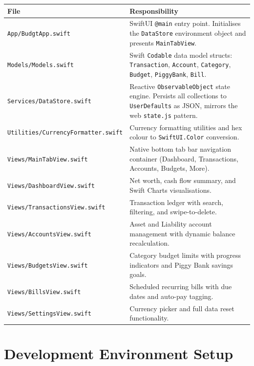 \documentclass[12pt, a4paper]{article}
\begin{document}
\begin{longtable}{L{4.5cm} L{10cm}}
  \toprule
  \textbf{File} & \textbf{Responsibility} \\
  \midrule
  \endhead
  \texttt{App/BudgtApp.swift} & SwiftUI \texttt{@main} entry point. Initialises the \texttt{DataStore} environment object and presents \texttt{MainTabView}. \\[4pt]
  \texttt{Models/Models.swift} & Swift \texttt{Codable} data model structs: \texttt{Transaction}, \texttt{Account}, \texttt{Category}, \texttt{Budget}, \texttt{PiggyBank}, \texttt{Bill}. \\[4pt]
  \texttt{Services/DataStore.swift} & Reactive \texttt{ObservableObject} state engine. Persists all collections to \texttt{UserDefaults} as JSON, mirrors the web \texttt{state.js} pattern. \\[4pt]
  \texttt{Utilities/CurrencyFormatter.swift} & Currency formatting utilities and hex colour to \texttt{SwiftUI.Color} conversion. \\[4pt]
  \texttt{Views/MainTabView.swift} & Native bottom tab bar navigation container (Dashboard, Transactions, Accounts, Budgets, More). \\[4pt]
  \texttt{Views/DashboardView.swift} & Net worth, cash flow summary, and Swift Charts visualisations. \\[4pt]
  \texttt{Views/TransactionsView.swift} & Transaction ledger with search, filtering, and swipe-to-delete. \\[4pt]
  \texttt{Views/AccountsView.swift} & Asset and Liability account management with dynamic balance recalculation. \\[4pt]
  \texttt{Views/BudgetsView.swift} & Category budget limits with progress indicators and Piggy Bank savings goals. \\[4pt]
  \texttt{Views/BillsView.swift} & Scheduled recurring bills with due dates and auto-pay tagging. \\[4pt]
  \texttt{Views/SettingsView.swift} & Currency picker and full data reset functionality. \\
  \bottomrule
\end{longtable}

\section{Development Environment Setup}
\end{document}
